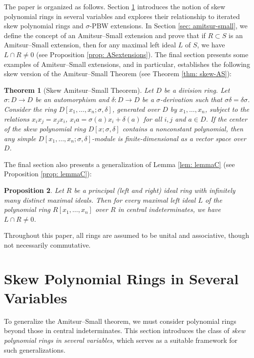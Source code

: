 \documentclass[11pt,a4paper]{article}
\theoremstyle{theorem}
\newtheorem{theorem}{Theorem}[section]
\newtheorem{proposition}[theorem]{Proposition}
\numberwithin{equation}{section}
\newcommand{\s}{\sigma}
\begin{document}
	 	 
	 The paper is organized as follows. Section \ref{sec: skew-several} introduces the notion of skew polynomial rings in several variables and explores their relationship to iterated skew polynomial rings and \(\sigma\)-PBW extensions.   In Section \ref{sec: amitsur-small}, we define the concept of an Amitsur--Small extension and prove that if \(R\subset S\) is an Amitsur--Small extension, then for any maximal left ideal \(L\) of \(S\), we have \(L\cap R\neq 0\) (see Proposition \ref{prop: ASextensions}).  The final section presents some examples of Amitsur--Small extensions, and in particular, establishes the following skew version of the Amitsur--Small Theorem (see Theorem \ref{thm: skew-AS}):
	 \begin{theorem}[Skew Amitsur--Small Theorem]
	 	Let $D$ be a division ring. Let $\s:D\to D$ be an automorphism and $\delta:D\to D$ be  a $\s$-derivation such that \(\sigma\delta = \delta\sigma\).  Consider the ring \(D[x_1,\dots,x_n;\sigma,\delta]\), generated over \(D\) by \(x_1,\dots,x_n\), subject to the relations \(x_ix_j=x_jx_i\), \(x_ia=\s(a)x_i+\delta(a)\) for all \(i,j\) and \(a\in D\). If the center of the skew polynomial ring $D[x;\s,\delta]$ contains a nonconstant polynomial, then any simple \(D[x_1,\dots,x_n;\sigma,\delta]\)-module is finite-dimensional as  a vector space over $D$.
	 \end{theorem}  
	 The final section also presents a generalization of Lemma \ref{lem: lemmaC} (see Proposition \ref{prop: lemmaC}):
	 	\begin{proposition}
	 	Let $R$ be a principal (left and right) ideal ring with infinitely many distinct maximal ideals. Then for every maximal left ideal $L$ of the polynomial ring $R[x_1,\dots,x_n]$ over \(R\) in central indeterminates, we have $L\cap R\neq 0$. 
	 \end{proposition}
	Throughout this paper, all rings are assumed to be unital and associative, though not necessarily commutative. 
\section{Skew Polynomial Rings in Several Variables}\label{sec: skew-several}
	To generalize the Amitsur--Small theorem,  we must consider polynomial rings beyond those in central indeterminates. This section introduces the class of \emph{skew polynomial rings in several variables}, which serves as a suitable framework for such generalizations. 
	
\end{document}
